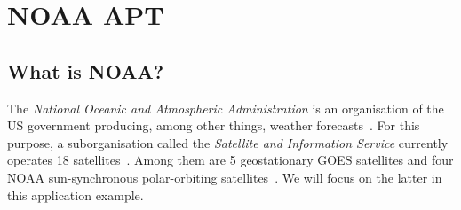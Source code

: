 \documentclass[conference]{IEEEtran}
\begin{document}
\section{NOAA APT} %
\subsection{What is NOAA?}
The \textit{National Oceanic and Atmospheric Administration} is an organisation of the US government producing, among other things, weather forecasts~\cite{NOAA19agency}. For this purpose, a suborganisation called the \textit{Satellite and Information Service} currently operates 18 satellites~\cite{NOAA19currently}. Among them are 5 geostationary GOES satellites and four NOAA sun-synchronous polar-orbiting satellites~\cite{NOAA19satellites}. We will focus on the latter in this application example.
\end{document}
